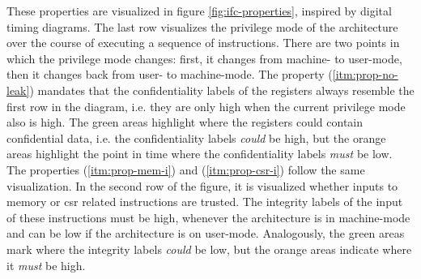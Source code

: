 These properties are visualized in figure \ref{fig:ifc-properties}, inspired by digital timing diagrams.
The last row visualizes the privilege mode of the architecture over the course of executing a sequence of instructions.
There are two points in which the privilege mode changes: first, it changes from machine- to user-mode, then it changes back from user- to machine-mode.
The  property (\ref{itm:prop-no-leak}) mandates that the confidentiality labels of the registers always resemble the first row in the diagram, i.e. they are only high when the current privilege mode also is high.
The green areas highlight where the registers could contain confidential data, i.e. the confidentiality  labels \textit{could} be high, but the orange areas highlight the point in time where the confidentiality labels \textit{must} be low.
The properties  (\ref{itm:prop-mem-i}) and  (\ref{itm:prop-csr-i}) follow the same visualization.
In the second row of the figure, it is visualized whether inputs to memory or \gls{csr} related instructions are trusted.
The integrity labels of the input of these instructions must be high, whenever the architecture is in machine-mode and can be low if the architecture is on user-mode.
Analogously, the green areas mark where the integrity labels \textit{could} be low, but the orange areas indicate where it \textit{must} be high.
